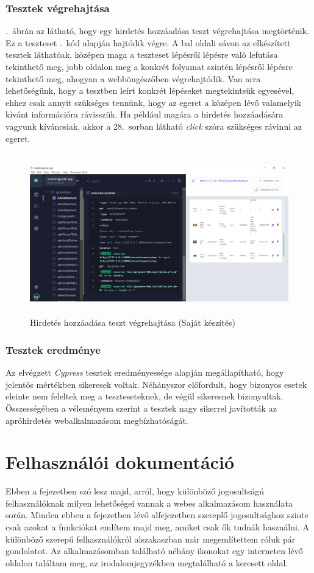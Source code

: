 \documentclass[]{thesis-ekf}
\theoremstyle{definition}
\theoremstyle{remark}
\begin{document}
	\subsection{Tesztek végrehajtása}
		.~ábrán az látható, hogy egy hirdetés hozzáadása teszt végrehajtása megtörténik. Ez a teszteset .~kód alapján hajtódik végre. A bal oldali sávon az elkészített tesztek láthatóak, középen maga a teszteset lépésről lépésre való lefutása tekinthető meg, jobb oldalon meg a konkrét folyamat szintén lépésről lépésre tekinthető meg, ahogyan a webböngészőben végrehajtódik. Van arra lehetőségünk, hogy a tesztben leírt konkrét lépéseket megtekintsük egyesével, ehhez csak annyit szükséges tennünk, hogy az egeret a középen lévő valamelyik kívánt információra rávisszük. Ha például magára a hirdetés hozzáadására vagyunk kíváncsiak, akkor a 28.~sorban látható \emph{click} szóra szükséges rávinni az egeret.
		\begin{figure}[ht!]
			\centering
			\includegraphics[height=7cm]{./teszteles/teszt}
			\caption{Hirdetés hozzáadása teszt végrehajtása (Saját készítés)} 
			\label{teszt-vegrehajtasa}
		\end{figure}
		
	\subsection{Tesztek eredménye}
		Az elvégzett \emph{Cypress} tesztek eredményessége alapján megállapítható, hogy jelentős mértékben sikeresek voltak. Néhányszor előfordult, hogy bizonyos esetek eleinte nem feleltek meg a teszteseteknek, de végül sikeresnek bizonyultak. Összességében a véleményem szerint a tesztek nagy sikerrel javították az apróhirdetés webalkalmazásom megbízhatóságát.   
		
	\chapter{Felhasználói dokumentáció}\label{ch-felhasznaloi}
		Ebben a fejezetben szó lesz majd, arról, hogy különböző jogosultságú felhasználóknak milyen lehetőségei vannak a webes alkalmazásom használata során. Minden ebben a fejezetben lévő alfejezetben szereplő jogosultsághoz szinte csak azokat a funkciókat említem majd meg, amiket csak ők tudnák használni. A különböző szerepű felhasználókról \az{\ref{sc-plantuml}} alszakaszban már megemlítettem róluk pár gondolatot. Az alkalmazásomban található néhány ikonokat egy interneten lévő oldalon találtam meg, az irodalomjegyzékben megtalálható a keresett oldal.\cite{Ikon} 
\end{document}
